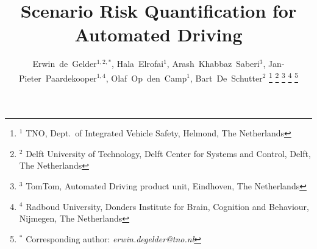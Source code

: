 \documentclass[journal]{IEEEtran}
\begin{document}
\date{}

\title{Scenario Risk Quantification for Automated Driving}

\author{Erwin~de~Gelder$^{1,2,*}$,
	    Hala~Elrofai$^{1}$,
	    Arash~Khabbaz~Saberi$^{3}$,
	    Jan-Pieter~Paardekooper$^{1,4}$,
	    Olaf~Op~den~Camp$^{1}$,
	    Bart~De~Schutter$^{2}$%
\thanks{$^1$ TNO, Dept.\ of Integrated Vehicle Safety, Helmond, The Netherlands}%
\thanks{$^2$ Delft University of Technology, Delft Center for Systems and Control, Delft, The Netherlands}%
\thanks{$^3$ TomTom, Automated Driving product unit, Eindhoven, The Netherlands}%
\thanks{$^4$ Radboud University, Donders Institute for Brain, Cognition and Behaviour, Nijmegen, The Netherlands}%
\thanks{$^*$ Corresponding author: \textit{erwin.degelder@tno.nl}}}%

\maketitle

\acresetall










\printbibliography
\end{document}
